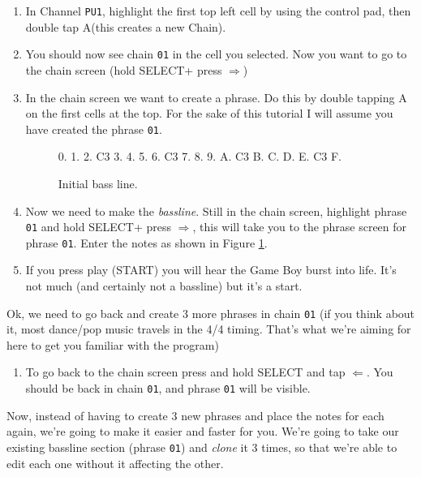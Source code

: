 \documentclass[]{article}
\newcommand{\buttonStyle}[1]{\textsf{#1}\xspace}
\newcommand{\buttonSymbolStyle}[1]{$\bm{#1}$\xspace}
\newcommand{\bA}{\buttonStyle{A}}
\newcommand{\bStart}{\buttonStyle{{START}}}
\newcommand{\bSelect}{\buttonStyle{{SELECT}}}
\newcommand{\bRight}{\buttonSymbolStyle{\Rightarrow}}
\newcommand{\bLeft}{\buttonSymbolStyle{\Leftarrow}}
\newcommand{\nb}[1]{\texttt{#1}\xspace}
\begin{document}
\begin{enumerate}

\item In Channel \nb{PU1}, highlight the first top left cell by using the control pad, then double tap \bA (this creates a new Chain).

\item You should now see chain \nb{01} in the cell you selected. Now you want to go to the chain screen (hold \bSelect + press \bRight)

\item In the chain screen we want to create a phrase. Do this by double tapping \bA on the first cells at the top. For the sake of this tutorial I will assume you have created the phrase \nb{01}.

\begin{figure}
\begin{notes}
0.
1.
2. C3
3.
4.
5.
6. C3
7.
8.
9.
A. C3
B.
C.
D.
E. C3
F.
\end{notes}	
\caption{Initial bass line.}\label{bassline}
\end{figure}

\item Now we need to make the \textit{bassline}. Still in the chain screen, highlight phrase \nb{01} and hold \bSelect + press \bRight, this will take you to the phrase screen for phrase \nb{01}. Enter the notes as shown in Figure \ref{bassline}.


\item If you press play (\bStart) you will hear the Game Boy burst into life. It's not much (and certainly not a bassline) but it's a start.

\end{enumerate}

Ok, we need to go back and create 3 more phrases in chain \nb{01} (if you think about it, most dance/pop music travels in the 4/4 timing. That's what we're aiming for here to get you familiar with the program) %

\begin{enumerate}[resume]


\item To go back to the chain screen press and hold \bSelect and tap \bLeft. You should be back in chain \nb{01}, and phrase \nb{01} will be visible.

\end{enumerate}

Now, instead of having to create 3 new phrases and place the notes for each again, we're going to make it easier and faster for you. We're going to take our existing bassline section (phrase \nb{01}) and \textit{clone} it 3 times, so that we're able to edit each one without it affecting the other. 
\end{document}

